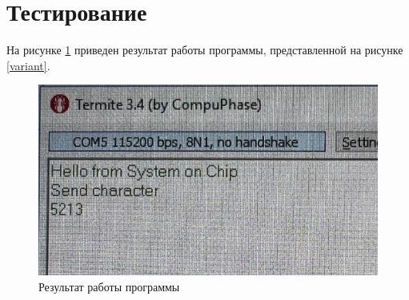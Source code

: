 \documentclass{article}
\begin{document}
\clearpage\section{Тестирование}
На рисунке \ref{verif} приведен результат работы программы, представленной на рисунке \ref{variant}.
\begin{figure}[h]
	\centering
	\includegraphics[scale=1]{tools/verif.png}
	\caption{Результат работы программы}
	\label{verif}
\end{figure}
\end{document}
